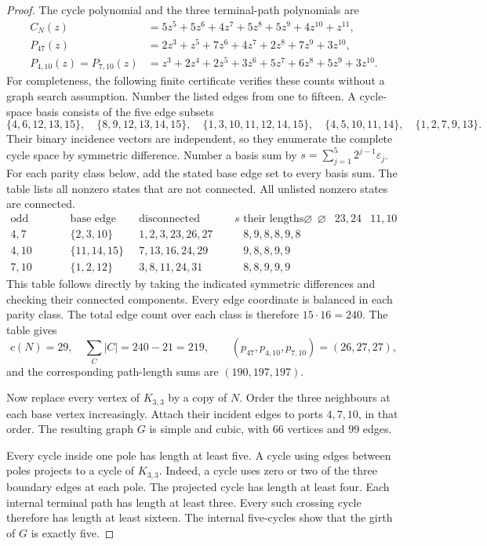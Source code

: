 \begin{proof}
The cycle polynomial and the three terminal-path polynomials are
\[
\begin{aligned}
 C_N(z)&=5z^5+5z^6+4z^7+5z^8+5z^9+4z^{10}+z^{11},\\
 P_{47}(z)&=2z^3+z^5+7z^6+4z^7+2z^8+7z^9+3z^{10},\\
 P_{4,10}(z)=P_{7,10}(z)
 &=z^3+2z^4+2z^5+3z^6+5z^7+6z^8+5z^9+3z^{10}.
\end{aligned}
\]
For completeness, the following finite certificate verifies these counts without a graph search assumption.
Number the listed edges from one to fifteen.
A cycle-space basis consists of the five edge subsets
\[
 \{4,6,12,13,15\},\quad
 \{8,9,12,13,14,15\},\quad
 \{1,3,10,11,12,14,15\},\quad
 \{4,5,10,11,14\},\quad
 \{1,2,7,9,13\}.
\]
Their binary incidence vectors are independent, so they enumerate the complete cycle space by symmetric difference.
Number a basis sum by $s=\sum_{j=1}^5 2^{j-1}\varepsilon_j$.
For each parity class below, add the stated base edge set to every basis sum.
The table lists all nonzero states that are not connected.
All unlisted nonzero states are connected.
\[
\begin{array}{c|c|c|c}
\text{odd vertices}&\text{base edge set}&\text{disconnected indices }s&
 \text{their lengths}\hline
\varnothing&\varnothing&23,24&11,10\\
4,7&\{2,3,10\}&1,2,3,23,26,27&8,9,8,8,9,8\\
4,10&\{11,14,15\}&7,13,16,24,29&9,8,8,9,9\\
7,10&\{1,2,12\}&3,8,11,24,31&8,8,9,9,9
\end{array}
\]
This table follows directly by taking the indicated symmetric differences and checking their connected components.
Every edge coordinate is balanced in each parity class.
The total edge count over each class is therefore $15\cdot16=240$.
The table gives
\[
 c(N)=29,\quad \sum_C|C|=240-21=219,
 \qquad (p_{47},p_{4,10},p_{7,10})=(26,27,27),
\]
and the corresponding path-length sums are $(190,197,197)$.

Now replace every vertex of $K_{3,3}$ by a copy of $N$.
Order the three neighbours at each base vertex increasingly.
Attach their incident edges to ports $4,7,10$, in that order.
The resulting graph $G$ is simple and cubic, with $66$ vertices and $99$ edges.

Every cycle inside one pole has length at least five.
A cycle using edges between poles projects to a cycle of $K_{3,3}$.
Indeed, a cycle uses zero or two of the three boundary edges at each pole.
The projected cycle has length at least four.
Each internal terminal path has length at least three.
Every such crossing cycle therefore has length at least sixteen.
The internal five-cycles show that the girth of $G$ is exactly five.


\end{proof}
